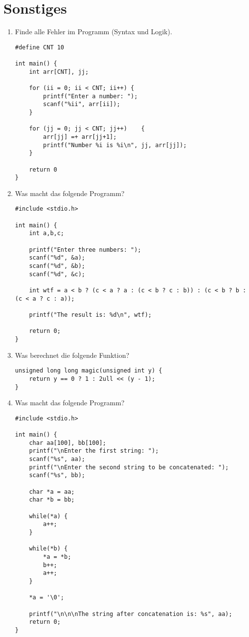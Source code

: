 \documentclass[]{scrartcl}
\begin{document}
\section{Sonstiges}
\begin{enumerate}[{1)}]
\item Finde alle Fehler im Programm (Syntax und Logik).
\begin{lstlisting}
#define CNT 10

int main() {
	int arr[CNT], jj;
	
	for (ii = 0; ii < CNT; ii++) {
		printf("Enter a number: ");
		scanf("%ii", arr[ii]);
	}

	for (jj = 0; jj < CNT; jj++)	{
		arr[jj] =+ arr[jj+1];
		printf("Number %i is %i\n", jj, arr[jj]);
	}

	return 0
}
\end{lstlisting}

\item Was macht das folgende Programm?
\begin{lstlisting}
#include <stdio.h>

int main() {
	int a,b,c;
	
	printf("Enter three numbers: ");
	scanf("%d", &a);
	scanf("%d", &b);
	scanf("%d", &c);
	
	int wtf = a < b ? (c < a ? a : (c < b ? c : b)) : (c < b ? b : (c < a ? c : a));
	
	printf("The result is: %d\n", wtf);
	
	return 0;
}
\end{lstlisting}

\item Was berechnet die folgende Funktion?
\begin{lstlisting}	
unsigned long long magic(unsigned int y) {
	return y == 0 ? 1 : 2ull << (y - 1);
}
\end{lstlisting}

\item Was macht das folgende Programm?
\begin{lstlisting}
#include <stdio.h>

int main() {
	char aa[100], bb[100];
	printf("\nEnter the first string: ");
	scanf("%s", aa);
	printf("\nEnter the second string to be concatenated: ");
	scanf("%s", bb);

	char *a = aa;
	char *b = bb;

	while(*a) {
		a++;
	}

	while(*b) {
		*a = *b;
		b++;
		a++;
	}

	*a = '\0';

	printf("\n\n\nThe string after concatenation is: %s", aa);
	return 0;
}
\end{lstlisting}
\end{enumerate}
\end{document}
